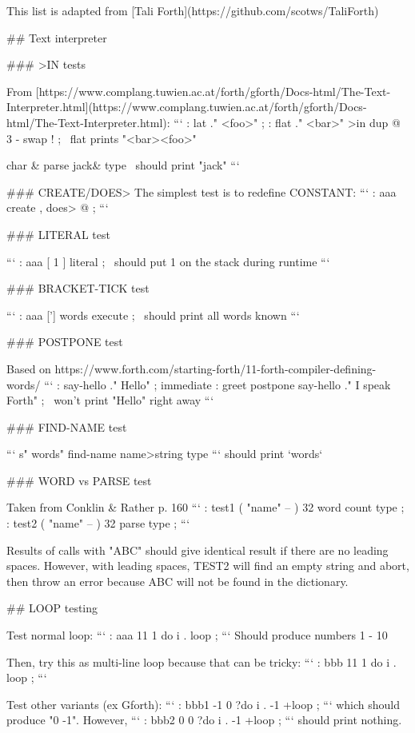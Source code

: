 

This list is adapted from [Tali Forth](https://github.com/scotws/TaliForth)

## Text interpreter

### >IN tests

From
[https://www.complang.tuwien.ac.at/forth/gforth/Docs-html/The-Text-Interpreter.html](https://www.complang.tuwien.ac.at/forth/gforth/Docs-html/The-Text-Interpreter.html):
```
: lat ." <foo>" ;
: flat ." <bar>" >in dup @ 3 - swap ! ; \ flat prints "<bar><foo>"

char & parse jack& type                 \ should print "jack"    
```

### CREATE/DOES>
The simplest test is to redefine CONSTANT:
```
: aaa create , does> @ ; 
```


### LITERAL test

```
: aaa [ 1 ] literal ;         \ should put 1 on the stack during runtime
```


### BRACKET-TICK test

```
: aaa ['] words execute ;     \ should print all words known
```


### POSTPONE test

Based on https://www.forth.com/starting-forth/11-forth-compiler-defining-words/
```
: say-hello ." Hello" ; immediate
: greet postpone say-hello ." I speak Forth" ; \ won't print "Hello" right away
```


### FIND-NAME test

```
s" words" find-name name>string type
``` 
should print `words`


### WORD vs PARSE test 

Taken from Conklin & Rather p. 160
```
: test1 ( "name" -- )  32 word  count type ; 
: test2 ( "name" -- )  32 parse  type ; 
```

Results of calls with "ABC" should give identical result if there are no
leading spaces. However, with leading spaces, TEST2 will find an empty string
and abort, then throw an error because ABC will not be found in the dictionary.


## LOOP testing

Test normal loop:
```
: aaa 11 1 do i . loop ;        
```
Should produce numbers 1 - 10

Then, try this as multi-line loop because that can be tricky:
```
: bbb 11 1 do 
  i . loop ; 
```

Test other variants (ex Gforth):
```
: bbb1 -1 0 ?do i . -1 +loop ;
```
which should produce "0 -1". However, 
```
: bbb2 0 0 ?do i . -1 +loop ;
```
should print nothing.


